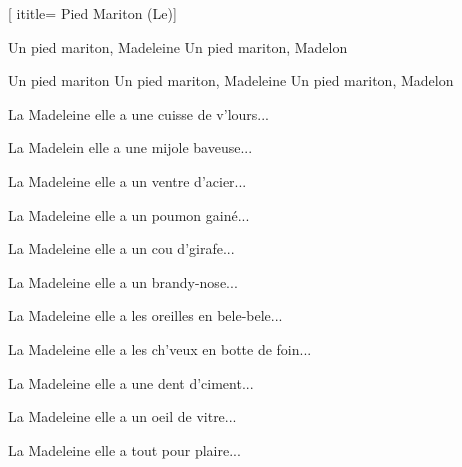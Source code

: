  [
ititle= {Pied Mariton (Le)}]

\beginverse
{}
Un pied mariton, Madeleine
Un pied mariton, Madelon
\endverse

\beginverse
{}
Un pied mariton
Un pied mariton, Madeleine
Un pied mariton, Madelon
\endverse

\beginverse
La Madeleine elle a une cuisse de v'lours...
\endverse

\beginverse
La Madelein elle a une mijole baveuse...
\endverse

\beginverse
La Madeleine elle a un ventre d'acier...
\endverse

\beginverse
La Madeleine elle a un poumon gainé...
\endverse

\beginverse
La Madeleine elle a un cou d'girafe...
\endverse

\beginverse
La Madeleine elle a un brandy-nose...
\endverse

\beginverse
La Madeleine elle a les oreilles en bele-bele...
\endverse

\beginverse
La Madeleine elle a les ch'veux en botte de foin...
\endverse

\beginverse
La Madeleine elle a une dent d'ciment...
\endverse

\beginverse
La Madeleine elle a un oeil de vitre...
\endverse

\beginverse
La Madeleine elle a tout pour plaire...
\endverse

\endsong